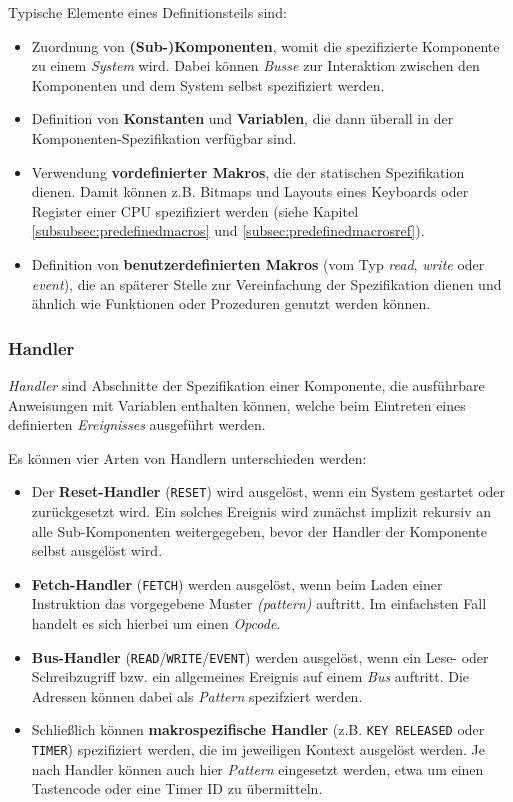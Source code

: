 \documentclass{scrartcl}
\begin{document}
\vspace{10pt}
\noindent Typische Elemente eines Definitionsteils sind:

\begin{itemize}
	\item Zuordnung von \textbf{(Sub-)Komponenten}, womit die spezifizierte Komponente zu einem \textit{System} wird. Dabei können \textit{Busse} zur Interaktion zwischen den Komponenten und dem System selbst spezifiziert werden.
	\item Definition von \textbf{Konstanten} und \textbf{Variablen}, die dann überall in der Komponenten-Spezifikation verfügbar sind.
	\item Verwendung \textbf{vordefinierter Makros}, die der statischen Spezifikation dienen. Damit können z.B. Bitmaps und Layouts eines Keyboards oder Register einer CPU spezifiziert werden (siehe Kapitel \ref{subsubsec:predefinedmacros} und \ref{subsec:predefinedmacrosref}).
	\item Definition von \textbf{benutzerdefinierten Makros} (vom Typ \textit{read}, \textit{write} oder \textit{event}), die an späterer Stelle zur Vereinfachung der Spezifikation dienen und ähnlich wie Funktionen oder Prozeduren genutzt werden können.
\end{itemize}

\subsubsection{Handler}

\noindent \textit{Handler} sind Abschnitte der Spezifikation einer Komponente, die ausführbare Anweisungen mit Variablen enthalten können, welche beim Eintreten eines definierten \textit{Ereignisses} ausgeführt werden.

\vspace{10pt}
\noindent Es können vier Arten von Handlern unterschieden werden:

\begin{itemize}
	\item Der \textbf{Reset-Handler} (\texttt{RESET}) wird ausgelöst, wenn ein System gestartet oder zurückgesetzt wird. Ein solches Ereignis wird zunächst implizit rekursiv an alle Sub-Komponenten weitergegeben, bevor der Handler der Komponente selbst ausgelöst wird.
	\item \textbf{Fetch-Handler} (\texttt{FETCH}) werden ausgelöst, wenn beim Laden einer Instruktion das vorgegebene Muster \textit{(pattern)} auftritt. Im einfachsten Fall handelt es sich hierbei um einen \textit{Opcode}.
	\item \textbf{Bus-Handler} (\texttt{READ}/\texttt{WRITE}/\texttt{EVENT}) werden ausgelöst, wenn ein Lese- oder Schreibzugriff bzw. ein allgemeines Ereignis auf einem \textit{Bus} auftritt. Die Adressen können dabei als \textit{Pattern} spezifziert werden.
	\item Schließlich können \textbf{makrospezifische Handler} (z.B. \texttt{KEY RELEASED} oder \texttt{TIMER}) spezifiziert werden, die im jeweiligen Kontext ausgelöst werden. Je nach Handler können auch hier \textit{Pattern} eingesetzt werden, etwa um einen Tastencode oder eine Timer ID zu übermitteln.
\end{itemize}
\end{document}
